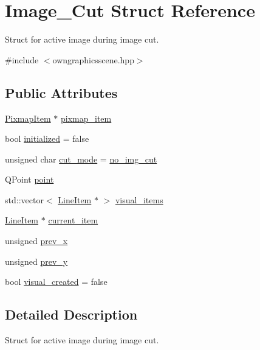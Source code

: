 \hypertarget{structImage__Cut}{}\section{Image\+\_\+\+Cut Struct Reference}
\label{structImage__Cut}


Struct for active image during image cut.  




{\ttfamily \#include $<$owngraphicsscene.\+hpp$>$}

\subsection*{Public Attributes}
\begin{DoxyCompactItemize}
\item 
\mbox{\hyperlink{classPixmapItem}{Pixmap\+Item}} $\ast$ \mbox{\hyperlink{structImage__Cut_afdafc46c968b35b63758d409ef863a8f}{pixmap\+\_\+item}}
\item 
bool \mbox{\hyperlink{structImage__Cut_a7259136300a6eade3ee84743f3e47c1f}{initialized}} = false
\item 
unsigned char \mbox{\hyperlink{structImage__Cut_ad4904a8753086961301a91050f6b2794}{cut\+\_\+mode}} = \mbox{\hyperlink{owngraphicsscene_8hpp_a749db80b860523fda0b90a1c2afa5067}{no\+\_\+img\+\_\+cut}}
\item 
Q\+Point \mbox{\hyperlink{structImage__Cut_a45fc996285a5ae8ef255d66655d63df2}{point}}
\item 
std\+::vector$<$ \mbox{\hyperlink{classLineItem}{Line\+Item}} $\ast$ $>$ \mbox{\hyperlink{structImage__Cut_ad56f1d72a3d7c5488fec27eaf5c6fbd9}{visual\+\_\+items}}
\item 
\mbox{\hyperlink{classLineItem}{Line\+Item}} $\ast$ \mbox{\hyperlink{structImage__Cut_aa3fcac1ab311c38947b343d8913fb2e8}{current\+\_\+item}}
\item 
unsigned \mbox{\hyperlink{structImage__Cut_a9e6768e7bea9a60876d086d78da3c4df}{prev\+\_\+x}}
\item 
unsigned \mbox{\hyperlink{structImage__Cut_ad86dabb21b97270448d8db5aa7a5676f}{prev\+\_\+y}}
\item 
bool \mbox{\hyperlink{structImage__Cut_acbae7507f135d85e9f2f9724fbc2a643}{visual\+\_\+created}} = false
\end{DoxyCompactItemize}


\subsection{Detailed Description}
Struct for active image during image cut. 

